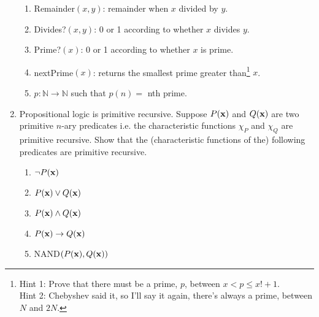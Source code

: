 \documentclass[11pt]{report}
\begin{document}
\begin{enumerate}
		\begin{enumerate}
			\item Remainder$(x,y)$: remainder when $x$ divided by $y$. 
			\item Divides?$(x,y)$: 0 or 1 according to whether $x$ divides $y$.
			\item Prime?$(x)$: 0 or 1 according to whether $x$ is prime. 
			\item nextPrime$(x)$: returns the smallest prime greater than\footnote{Hint 1: Prove that there must be a prime, $p$, between $x < p \leq x! + 1$. \\ Hint 2: Chebyshev said it, so I'll say it again, there's always a prime, between $N$ and $2N$.} $x$. 
			\item $p: \mathbb{N} \rightarrow \mathbb{N}$ such that $p(n) = $ nth prime. 
		\end{enumerate}
	
	\item Propositional logic is primitive recursive. Suppose $P({\bf x})$ and $Q({\bf x})$ are two primitive $n$-ary predicates i.e. the characteristic functions $\chi_{P}$ and $\chi_{Q}$ are primitive recursive. Show that the (characteristic functions of the) following predicates are primitive recursive. 
		
		\begin{enumerate}
			\item $\lnot P({\bf x})$
			\item $P({\bf x}) \lor Q({\bf x})$ 
			\item $P({\bf x}) \land Q({\bf x})$ 
			\item $P({\bf x}) \to Q({\bf x})$ 
			\item NAND$(P({\bf x}), Q({\bf x}))$
		\end{enumerate}


	




\end{enumerate}
\end{document}
